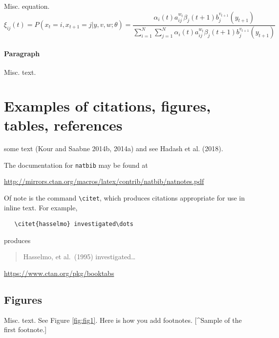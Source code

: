 \documentclass{article}
\begin{document}
Misc. equation. \[
\xi _{ij}(t)=P(x_{t}=i,x_{t+1}=j|y,v,w;\theta)= {\frac {\alpha _{i}(t)a^{w_t}_{ij}\beta _{j}(t+1)b^{v_{t+1}}_{j}(y_{t+1})}{\sum _{i=1}^{N} \sum _{j=1}^{N} \alpha _{i}(t)a^{w_t}_{ij}\beta _{j}(t+1)b^{v_{t+1}}_{j}(y_{t+1})}}
\]

\paragraph{Paragraph}

Misc. text.

\hypertarget{examples-of-citations-figures-tables-references}{%
\section{Examples of citations, figures, tables,
references}\label{examples-of-citations-figures-tables-references}}

\label{sec:others}

\lipsum[8] some text (Kour and Saabne 2014b, 2014a) and see Hadash et
al. (2018).

The documentation for \verb+natbib+ may be found at

\begin{center}
  \url{http://mirrors.ctan.org/macros/latex/contrib/natbib/natnotes.pdf}
\end{center}

Of note is the command \verb+\citet+, which produces citations
appropriate for use in inline text. For example,

\begin{verbatim}
   \citet{hasselmo} investigated\dots
\end{verbatim}

produces

\begin{quote}
  Hasselmo, et al.\ (1995) investigated\dots
\end{quote}

\begin{center}
  \url{https://www.ctan.org/pkg/booktabs}
\end{center}

\hypertarget{figures}{%
\subsection{Figures}\label{figures}}

Misc. text. See Figure \ref{fig:fig1}. Here is how you add footnotes.
{[}\^{}Sample of the first footnote.{]}
\end{document}
